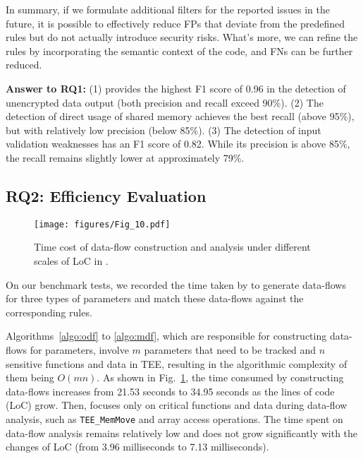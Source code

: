In summary, if we formulate additional filters for the reported issues in the future, it is possible to effectively reduce FPs that deviate from the predefined rules but do not actually introduce security risks. What's more, we can refine the rules by incorporating the semantic context of the code, and FNs can be further reduced.

\begin{tcolorbox} [colback=gray!20!white]
\textbf{Answer to RQ1:}
(1) \ccSysName provides the highest F1 score of 0.96 in the detection of unencrypted data output (both precision and recall exceed 90\%).
(2) The detection of direct usage of shared memory achieves the best recall (above 95\%), but with relatively low precision (below 85\%).
(3) The detection of input validation weaknesses has an F1 score of 0.82. While its precision is above 85\%, the recall remains slightly lower at approximately 79\%.
\end{tcolorbox}

\subsection{RQ2: Efficiency Evaluation}

\begin{figure}
    \centering
    \texttt{[image: figures/Fig\_10.pdf]}
    \caption{Time cost of data-flow construction and analysis under different scales of LoC in \ccSysName.}
    \label{fig:effi}
\end{figure}

On our benchmark tests, we recorded the time taken by \ccSysName to generate data-flows for three types of parameters and match these data-flows against the corresponding rules.

Algorithms~\ref{algo:odf} to \ref{algo:mdf}, which are responsible for constructing data-flows for parameters, involve $m$ parameters that need to be tracked and $n$ sensitive functions and data in TEE, resulting in the algorithmic complexity of them being $O(mn)$.
As shown in Fig.~\ref{fig:effi}, the time consumed by constructing data-flows increases from 21.53 seconds to 34.95 seconds as the lines of code (LoC) grow. 
Then, \ccSysName focuses only on critical functions and data during data-flow analysis, such as \texttt{TEE\_MemMove} and array access operations. The time spent on data-flow analysis remains relatively low and does not grow significantly with the changes of LoC (from 3.96 milliseconds to 7.13 milliseconds).

